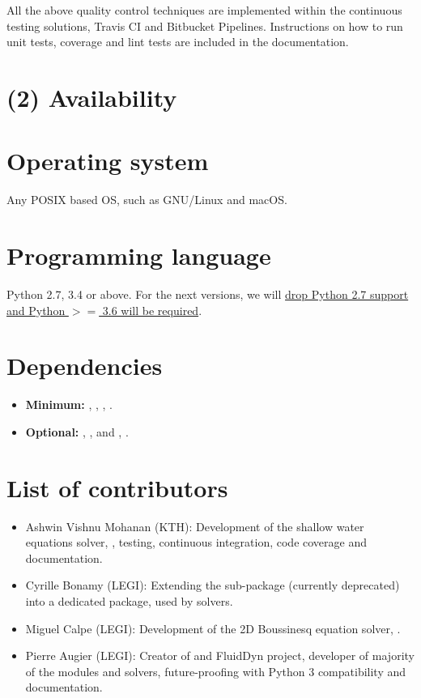 \documentclass{../jors}
\begin{document}
All the above quality control techniques are implemented within the continuous
testing solutions, Travis CI and Bitbucket Pipelines. Instructions on how to
run unit tests, coverage and lint tests are included in the documentation.

\section*{(2) Availability}
\vspace{0.5cm}
\section*{Operating system}

Any POSIX based OS, such as GNU/Linux and macOS.

\section*{Programming language}

Python 2.7, 3.4 or above. For the next versions, we will
\href{https://python3statement.org/}{drop Python 2.7 support and Python $>=$
3.6 will be required}.

\section*{Dependencies}

\begin{itemize}
\item {\bf Minimum:} , \Numpy, , 
\cite[and FFT libraries, see][]{fluidfft}.
\item {\bf Optional:} \Scipy, ,  and
, .
\end{itemize}

\section*{List of contributors}

\begin{itemize}
\item Ashwin Vishnu Mohanan (KTH): Development of the shallow water equations
solver, , testing, continuous integration,
code coverage and documentation.
\item Cyrille Bonamy (LEGI): Extending the sub-package
 (currently deprecated) into a
dedicated package,  used by  solvers.
\item Miguel Calpe (LEGI): Development of the 2D Boussinesq equation solver,
.
\item Pierre Augier (LEGI): Creator of  and FluidDyn project,
developer of majority of the modules and solvers, future-proofing with Python 3
compatibility and documentation.
\end{itemize}
\end{document}
